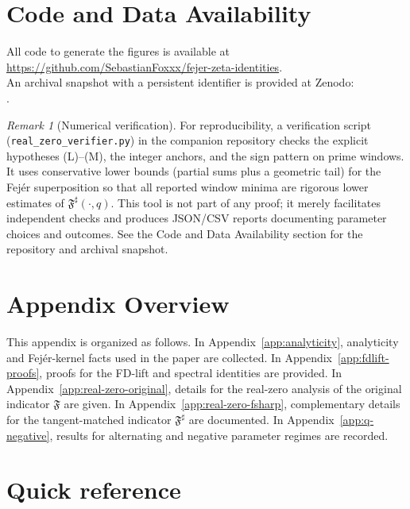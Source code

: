 \documentclass[11pt,a4paper]{amsart}
\newcommand{\Fbase}{\mathfrak F}
\newcommand{\Fsharp}{\Fbase^{\sharp}}
\theoremstyle{plain}
\theoremstyle{definition}
\theoremstyle{remark}
\newtheorem{remark}[theorem]{Remark}
\begin{document}
\section*{Code and Data Availability}
All code to generate the figures is available at \\
\url{https://github.com/SebastianFoxxx/fejer-zeta-identities}.\\
An archival snapshot with a persistent identifier is provided at Zenodo:\\
.

\begin{remark}[Numerical verification]
For reproducibility, a verification script \\
(\texttt{real\_zero\_verifier.py}) in the companion repository
checks the explicit hypotheses \textup{(L)}–\textup{(M)}, the integer anchors, and the sign pattern on prime windows.
It uses conservative lower bounds (partial sums plus a geometric tail) for the Fej\'er superposition so that all reported
window minima are rigorous lower estimates of $\Fsharp(\cdot,q)$.
This tool is not part of any proof; it merely facilitates independent checks and produces JSON/CSV reports
documenting parameter choices and outcomes.
See the Code and Data Availability section for the repository and archival snapshot.
\end{remark}

\appendix

\section*{Appendix Overview}
This appendix is organized as follows. In Appendix~\ref{app:analyticity}, analyticity and Fej\'er-kernel facts used in the paper are collected. In Appendix~\ref{app:fdlift-proofs}, proofs for the FD-lift and spectral identities are provided. In Appendix~\ref{app:real-zero-original}, details for the real-zero analysis of the original indicator $\mathfrak F$ are given. In Appendix~\ref{app:real-zero-fsharp}, complementary details for the tangent-matched indicator $\Fsharp$ are documented. In Appendix~\ref{app:q-negative}, results for alternating and negative parameter regimes are recorded.


\section{Quick reference}\label{app:quickref}
\end{document}
